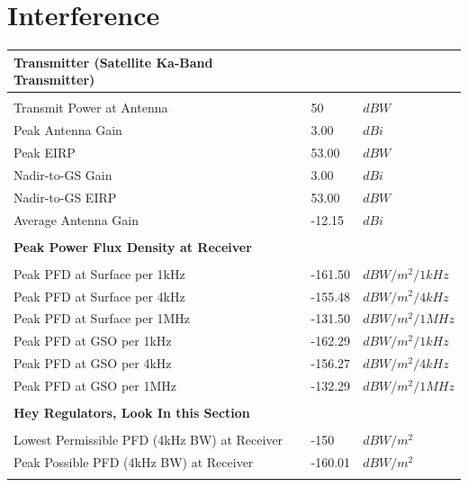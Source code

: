 \documentclass{article}
\begin{document}
\section{Interference}
\label{section::interference}
\begin{center}
  \begin{tabular}{p{3in}p{1in}l}
\textbf{Transmitter (Satellite Ka-Band Transmitter)} & & \\
\hline \\
Transmit Power at Antenna & 50 & $dBW$ \\
Peak Antenna Gain & 3.00 & $dBi$ \\
Peak EIRP & 53.00 & $dBW$ \\
Nadir-to-GS Gain & 3.00 & $dBi$ \\
Nadir-to-GS EIRP & 53.00 & $dBW$ \\
Average Antenna Gain & -12.15 & $dBi$ \\
\\
\textbf{Peak Power Flux Density at Receiver} & & \\
\hline \\
Peak PFD at Surface per 1kHz & -161.50 & $dBW/m^2/1kHz$ \\
Peak PFD at Surface per 4kHz & -155.48 & $dBW/m^2/4kHz$ \\
Peak PFD at Surface per 1MHz & -131.50 & $dBW/m^2/1MHz$ \\
Peak PFD at GSO per 1kHz & -162.29 & $dBW/m^2/1kHz$ \\
Peak PFD at GSO per 4kHz & -156.27 & $dBW/m^2/4kHz$ \\
Peak PFD at GSO per 1MHz & -132.29 & $dBW/m^2/1MHz$ \\
\\
\textbf{Hey Regulators, Look In this Section} & & \\
\hline \\
Lowest Permissible PFD (4kHz BW) at Receiver & -150 & $dBW/m^2$ \\
Peak Possible PFD (4kHz BW) at Receiver & -160.01 & $dBW/m^2$ \\
\\
\end{tabular}


\end{center}
\end{document}
